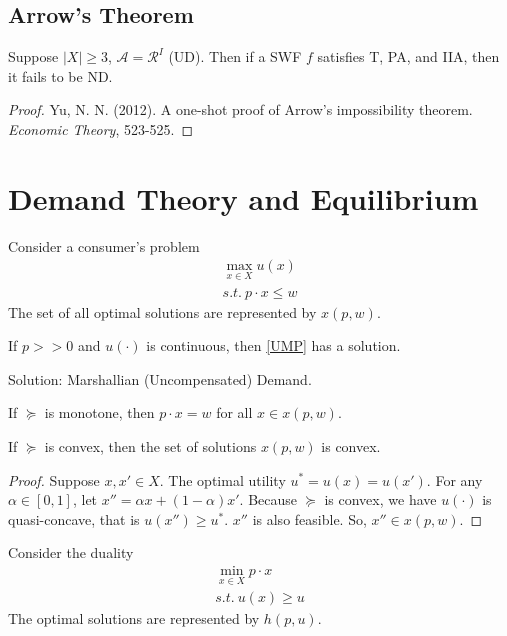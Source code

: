 \documentclass[11pt]{elegantbook}
\begin{document}
\subsection{Arrow's Theorem}
\begin{theorem}
    Suppose $|X|\geq 3$, $\mathcal{A}=\mathcal{R}^I$ (UD). Then if a SWF $f$ satisfies T, PA, and IIA, then it fails to be ND.
\end{theorem}
\begin{proof}
    \normalfont
    Yu, N. N. (2012). A one-shot proof of Arrow's impossibility theorem. \textit{Economic Theory}, 523-525.
\end{proof}


\section{Demand Theory and Equilibrium}
Consider a consumer's problem
\begin{equation}
    \begin{aligned}
        \max_{x\in X} u(x)\\
        s.t.\ p\cdot x\leq w
    \end{aligned}
    \tag{UMP}
    \label{UMP}
\end{equation}
The set of all optimal solutions are represented by $x(p,w)$.

\begin{proposition}
    If $p>>0$ and $u(\cdot)$ is continuous, then \ref{UMP} has a solution.
\end{proposition}
Solution: Marshallian (Uncompensated) Demand.

\begin{proposition}
    If $\succeq$ is monotone, then $p\cdot x=w$ for all $x\in x(p,w)$.
\end{proposition}

\begin{proposition}
    If $\succeq$ is convex, then the set of solutions $x(p,w)$ is convex.
\end{proposition}
\begin{proof}
    Suppose $x,x'\in X$. The optimal utility $u^*=u(x)=u(x')$. For any $\alpha\in[0,1]$, let $x''=\alpha x+(1-\alpha)x'$. Because $\succeq$ is convex, we have $u(\cdot)$ is quasi-concave, that is $u(x'')\geq u^*$. $x''$ is also feasible. So, $x''\in x(p,w)$.
\end{proof}

Consider the duality
\begin{equation}
    \begin{aligned}
        \min_{x\in X} p\cdot x\\
        s.t.\ u(x)\geq u
    \end{aligned}
    \tag{EMP}
    \label{EMP}
\end{equation}
The optimal solutions are represented by $h(p,u)$.
\end{document}
